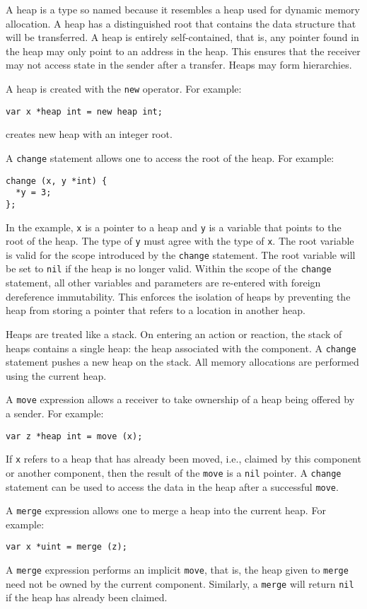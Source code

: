 A heap is a type so named because it resembles a heap used for dynamic memory allocation.
A heap has a distinguished root that contains the data structure that will be transferred.
A heap is entirely self-contained, that is, any pointer found in the heap may only point to an address in the heap.
This ensures that the receiver may not access state in the sender after a transfer.
Heaps may form hierarchies.

A heap is created with the \verb+new+ operator.
For example:
\begin{verbatim}
var x *heap int = new heap int;
\end{verbatim}
creates new heap with an integer root.

A \verb+change+ statement allows one to access the root of the heap.
For example:
\begin{verbatim}
change (x, y *int) {
  *y = 3;
};
\end{verbatim}
In the example, \verb+x+ is a pointer to a heap and \verb+y+ is a variable that points to the root of the heap.
The type of \verb+y+ must agree with the type of \verb+x+.
The root variable is valid for the scope introduced by the \verb+change+ statement.
The root variable will be set to \verb+nil+ if the heap is no longer valid.
Within the scope of the \verb+change+ statement, all other variables and parameters are re-entered with foreign dereference immutability.
This enforces the isolation of heaps by preventing the heap from storing a pointer that refers to a location in another heap.

Heaps are treated like a stack.
On entering an action or reaction, the stack of heaps contains a single heap:  the heap associated with the component.
A \verb+change+ statement pushes a new heap on the stack.
All memory allocations are performed using the current heap.

A \verb+move+ expression allows a receiver to take ownership of a heap being offered by a sender.
For example:
\begin{verbatim}
var z *heap int = move (x);
\end{verbatim}
If \verb+x+ refers to a heap that has already been moved, i.e., claimed by this component or another component, then the result of the \verb+move+ is a \verb+nil+ pointer.
A \verb+change+ statement can be used to access the data in the heap after a successful \verb+move+.

A \verb+merge+ expression allows one to merge a heap into the current heap.
For example:
\begin{verbatim}
var x *uint = merge (z);
\end{verbatim}
A \verb+merge+ expression performs an implicit \verb+move+, that is, the heap given to \verb+merge+ need not be owned by the current component.
Similarly, a \verb+merge+ will return \verb+nil+ if the heap has already been claimed.

